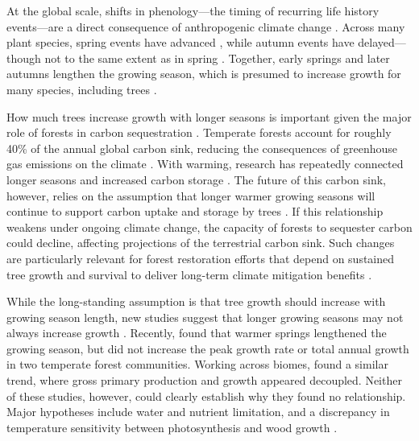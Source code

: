 \documentclass{article}\usepackage[]{graphicx}\usepackage[]{xcolor}
\begin{document}
At the global scale, shifts in phenology---the timing of recurring life history events---are a direct consequence of anthropogenic climate change \citep{parmesan_poleward_1999, menzel_european_2006, calvin_ipcc_2023}. Across many plant species, spring events have advanced \citep{wolfe_climate_2005,chmielewski_response_2001,fu_recent_2014}, while autumn events have delayed---though not to the same extent as in spring \citep{gallinat_autumn_2015,jeong_macroscale_2014}. Together, early springs and later autumns lengthen the growing season, which is presumed to increase growth for many species, including trees \citep{keenan_net_2014, stridbeck_partly_2022}. 

How much trees increase growth with longer seasons is important given the major role of forests in carbon sequestration \citep{friedlingstein_global_2026}. Temperate forests account for roughly 40\% of the annual global carbon sink, reducing the consequences of greenhouse gas emissions on the climate \citep{gibbs_revised_2025}. With warming, research has repeatedly connected longer seasons and increased carbon storage \citep{boisvenue_impacts_2006,gaoEarlierStartThermal2022,finzi_carbon_2020}. The future of this carbon sink, however, relies on the assumption that longer warmer growing seasons will continue to support carbon uptake and storage by trees \citep{pan_enduring_2024}. If this relationship weakens under ongoing climate change, the capacity of forests to sequester carbon could decline, affecting projections of the terrestrial carbon sink. Such changes are particularly relevant for forest restoration efforts that depend on sustained tree growth and survival to deliver long-term climate mitigation benefits \citep{cook-patton_mapping_2020}. 


While the long-standing assumption is that tree growth should increase with growing season length, new studies suggest that longer growing seasons may not always increase growth \citep{dow_warm_2022,silvestro_longer_2023,matula_shifts_2023,charletdesauvage_temperature_2022,cabon_crossbiome_2022}. Recently, \cite{dow_warm_2022} found that warmer springs lengthened the growing season, but did not increase the peak growth rate or total annual growth in two temperate forest communities. Working across biomes, \cite{cabon_crossbiome_2022} found a similar trend, where gross primary production and growth appeared decoupled. Neither of these studies, however, could clearly establish why they found no relationship. Major hypotheses include water and nutrient limitation, and a discrepancy in temperature sensitivity between photosynthesis and wood growth \citep{cabon_crossbiome_2022,dow_warm_2022}.
\end{document}
